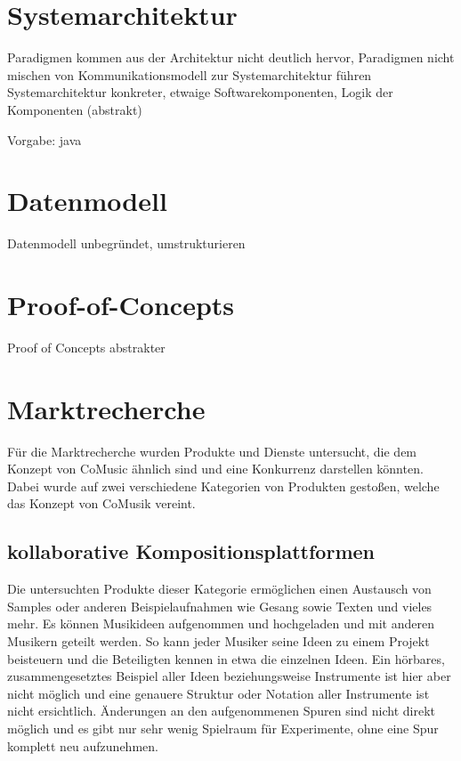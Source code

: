 \documentclass[12pt]{scrartcl}
\begin{document}

\section{Systemarchitektur}

Paradigmen kommen aus der Architektur nicht deutlich hervor, Paradigmen nicht mischen
von Kommunikationsmodell zur Systemarchitektur führen
Systemarchitektur konkreter, etwaige Softwarekomponenten, Logik der Komponenten (abstrakt)

Vorgabe: java


\section{Datenmodell}

Datenmodell unbegründet, umstrukturieren


\section{Proof-of-Concepts}

Proof of Concepts abstrakter


\section{Marktrecherche}


Für die Marktrecherche wurden Produkte und Dienste untersucht, die dem Konzept von CoMusic ähnlich sind und eine Konkurrenz darstellen könnten. Dabei wurde auf zwei verschiedene Kategorien von Produkten gestoßen, welche das Konzept von CoMusik vereint.

\subsection{kollaborative Kompositionsplattformen}

Die untersuchten Produkte dieser Kategorie ermöglichen einen Austausch von Samples oder anderen Beispielaufnahmen wie Gesang sowie Texten und vieles mehr. Es können Musikideen aufgenommen und hochgeladen und mit anderen Musikern geteilt werden. So kann jeder Musiker seine Ideen zu einem Projekt beisteuern und die Beteiligten kennen in etwa die einzelnen Ideen. Ein hörbares, zusammengesetztes Beispiel aller Ideen beziehungsweise Instrumente ist hier aber nicht möglich und eine genauere Struktur oder Notation aller Instrumente ist nicht ersichtlich. Änderungen an den aufgenommenen Spuren sind nicht direkt möglich und es gibt nur sehr wenig Spielraum für Experimente, ohne eine Spur komplett neu aufzunehmen.
\end{document}
